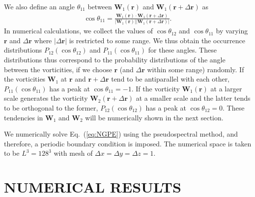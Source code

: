 \documentclass[aps,onecolumn,pra,longbibliography]{revtex4}
\begin{document}
	We also define an angle $\theta_{11}$ between
	$\bm{W}_1(\bm{r})$ and $\bm{W}_1(\bm{r}+\Delta\bm{r})$ as
	\begin{eqnarray}
		\label{eq:ANTI}
		\cos \theta_{11}
		= \frac{{\bm W}_1({\bm r}) \cdot {\bm W}_1({\bm r} + \Delta {\bm r}) }
		{
			|{\bm W}_1({\bm r})| |{\bm W}_1({\bm r} + \Delta {\bm r})|
		}.
	\end{eqnarray}
	In numerical calculations, we collect the values of
	$\cos \theta_{12}$ and $\cos \theta_{11}$
	by varying
	$\bm{r}$ and $\Delta\bm{r}$ where $|\Delta\bm{r}|$ is
	restricted to some range.
	We thus obtain the occurrence distributions
	$P_{12}(\cos \theta_{12})$ and $P_{11}(\cos \theta_{11})$ for these angles.
	These distributions thus correspond to the probability distributions
	of the angle between the vorticities, if we choose $\bm{r}$
	(and $\Delta \bm{r}$ within some range) randomly.
	If the vorticities $\bm{W}_1$ at $\bm{r}$ and $\bm{r} + \Delta \bm{r}$
	tend to be antiparallel with each other, $P_{11}(\cos \theta_{11})$
	has a peak at $\cos \theta_{11} = -1$.
	If the vorticity $\bm{W}_1(\bm{r})$ at a larger scale
	generates the vorticity $\bm{W}_2(\bm{r}+\Delta \bm{r})$ at a smaller scale
	and the latter tends to be orthogonal to the former,
	$P_{12}(\cos \theta_{12})$ has a peak at $\cos \theta_{12} = 0$.
	These tendencies in $\bm{W}_1$ and $\bm{W}_2$ will be
	numerically shown in the next section.


	We numerically solve Eq.~(\ref{eq:NGPE}) using the pseudospectral method,
	and therefore, a periodic boundary condition is imposed.
	The numerical space is taken to be $L^3=128^3$ with mesh of
	$\Delta x = \Delta y = \Delta z = 1$.
	\section{NUMERICAL RESULTS}
	\label{s:results}
\end{document}
